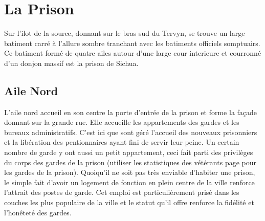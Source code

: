 \section{La Prison}

Sur l'ilot de la source, donnant sur le bras sud du Tervyn, se trouve un large batiment carré à l'allure sombre
tranchant avec les batiments officiels somptuairs. Ce batiment formé
de quatre ailes autour d'une large cour interieure et courronné d'un donjon
massif est la prison de Sichua.

\subsection{Aile Nord}

L'aile nord accueil en son centre la porte d'entrée de la prison et forme la 
façade donnant sur la grande rue. Elle accueille les appartements des gardes 
et les bureaux administratifs. C'est ici que sont géré l'accueil des nouveaux 
prisonniers et la libération des pentionnaires ayant fini de servir leur 
peine. Un certain nombre de garde y ont aussi un petit appartement, ceci fait 
parti des privilèges du corps des gardes de la prison (utiliser les 
statistiques des vétérants page \pageref{Veteran} pour les gardes de la 
prison). Quoiqu'il ne soit pas très enviable d'habiter une prison, le simple 
fait d'avoir un logement de fonction en plein centre de la ville renforce 
l'attrait des postes de garde. Cet emploi est particulièrement prisé dans 
les couches les plus populaire de la ville et le statut qu'il offre renforce 
la fidélité et l'honêteté des gardes.

